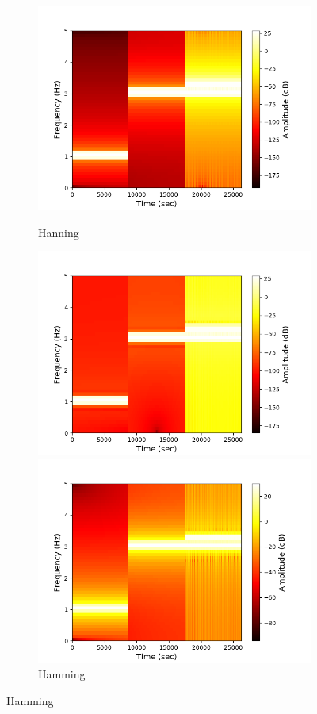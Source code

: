 \begin{figure}[H]
\centering
\begin{subfigure}{0.49\textwidth}
\centering
\includegraphics[width=\textwidth]{figures/stft_windows/100/hanning.png}
\caption{Hanning}
\label{fig:stft_hanning_100}
\includegraphics[width=\textwidth]{figures/stft_windows/100/hamming.png}
\caption{Hamming}
\label{fig:stft_hamming_100}
\includegraphics[width=\textwidth]{figures/stft_windows/100/kaiser_4.png}

\end{subfigure}
\end{figure}
